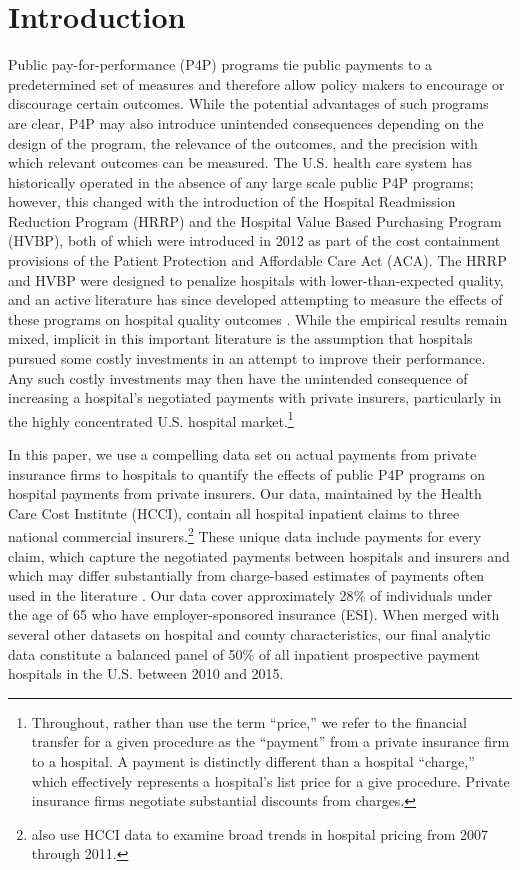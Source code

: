 \documentclass[12pt]{article}
\begin{document}
\newpage
\section{Introduction}
\onehalfspacing
Public pay-for-performance (P4P) programs tie public payments to a predetermined set of measures and therefore allow policy makers to encourage or discourage certain outcomes. While the potential advantages of such programs are clear, P4P may also introduce unintended consequences depending on the design of the program, the relevance of the outcomes, and the precision with which relevant outcomes can be measured. The U.S. health care system has historically operated in the absence of any large scale public P4P programs; however, this changed with the introduction of the Hospital Readmission Reduction Program (HRRP) and the Hospital Value Based Purchasing Program (HVBP), both of which were introduced in 2012 as part of the cost containment provisions of the Patient Protection and Affordable Care Act (ACA). The HRRP and HVBP were designed to penalize hospitals with lower-than-expected quality, and an active literature has since developed attempting to measure the effects of these programs on hospital quality outcomes \citep{ryan2015,mellor2016,gupta2016,ryan2017,gupta2018,wilcock2018}. While the empirical results remain mixed, implicit in this important literature is the assumption that hospitals pursued some costly investments in an attempt to improve their performance. Any such costly investments may then have the unintended consequence of increasing a hospital's negotiated payments with private insurers, particularly in the highly concentrated U.S. hospital market.\footnote{Throughout, rather than use the term ``price,'' we refer to the financial transfer for a given procedure as the ``payment'' from a private insurance firm to a hospital. A payment is distinctly different than a hospital ``charge,'' which effectively represents a hospital's list price for a give procedure. Private insurance firms negotiate substantial discounts from charges.}

In this paper, we use a compelling data set on actual payments from private insurance firms to hospitals to quantify the effects of public P4P programs on hospital payments from private insurers. Our data, maintained by the Health Care Cost Institute (HCCI), contain all hospital inpatient claims to three national commercial insurers.\footnote{\cite{cooper2017} also use HCCI data to examine broad trends in hospital pricing from 2007 through 2011.}  These unique data include payments for every claim, which capture the negotiated payments between hospitals and insurers and which may differ substantially from charge-based estimates of payments often used in the literature \citep{dafny2009,dranove2017}. Our data cover approximately 28$\%$ of individuals under the age of 65 who have employer-sponsored insurance (ESI). When merged with several other datasets on hospital and county characteristics, our final analytic data constitute a balanced panel of 50$\%$ of all inpatient prospective payment hospitals in the U.S. between 2010 and 2015.
\end{document}
